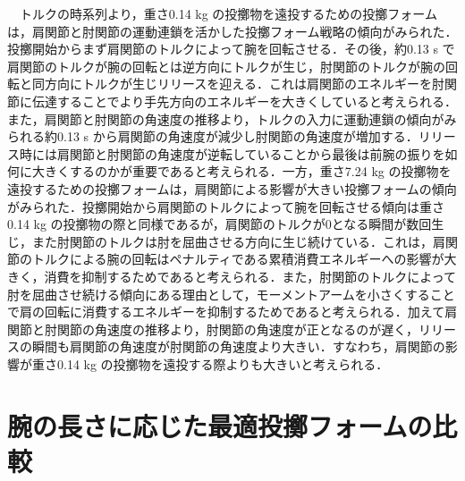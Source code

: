 　トルクの時系列より，重さ0.14 kg の投擲物を遠投するための投擲フォームは，肩関節と肘関節の運動連鎖を活かした投擲フォーム戦略の傾向がみられた．投擲開始からまず肩関節のトルクによって腕を回転させる．その後，約0.13 s で肩関節のトルクが腕の回転とは逆方向にトルクが生じ，肘関節のトルクが腕の回転と同方向にトルクが生じリリースを迎える．これは肩関節のエネルギーを肘関節に伝達することでより手先方向のエネルギーを大きくしていると考えられる．また，肩関節と肘関節の角速度の推移より，トルクの入力に運動連鎖の傾向がみられる約0.13 s から肩関節の角速度が減少し肘関節の角速度が増加する．リリース時には肩関節と肘関節の角速度が逆転していることから最後は前腕の振りを如何に大きくするのかが重要であると考えられる．一方，重さ7.24 kg の投擲物を遠投するための投擲フォームは，肩関節による影響が大きい投擲フォームの傾向がみられた．投擲開始から肩関節のトルクによって腕を回転させる傾向は重さ0.14 kg の投擲物の際と同様であるが，肩関節のトルクが0となる瞬間が数回生じ，また肘関節のトルクは肘を屈曲させる方向に生じ続けている．これは，肩関節のトルクによる腕の回転はペナルティである累積消費エネルギーへの影響が大きく，消費を抑制するためであると考えられる．また，肘関節のトルクによって肘を屈曲させ続ける傾向にある理由として，モーメントアームを小さくすることで肩の回転に消費するエネルギーを抑制するためであると考えられる．加えて肩関節と肘関節の角速度の推移より，肘関節の角速度が正となるのが遅く，リリースの瞬間も肩関節の角速度が肘関節の角速度より大きい．すなわち，肩関節の影響が重さ0.14 kg の投擲物を遠投する際よりも大きいと考えられる．\\

\clearpage
{}

\clearpage
\section{腕の長さに応じた最適投擲フォームの比較}
